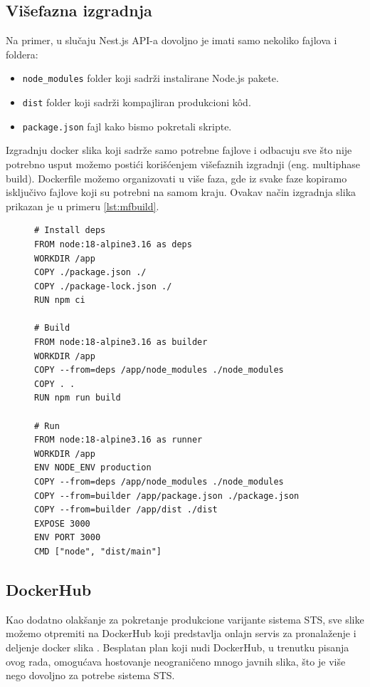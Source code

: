 \documentclass[12pt,oneside]{memoir}
\begin{document}
\subsection{Višefazna izgradnja}
Na primer, u slučaju Nest.js API-a dovoljno je imati samo nekoliko fajlova i foldera: 
\begin{itemize}
    \item \verb|node_modules| folder koji sadrži instalirane Node.js pakete.
    \item \verb|dist| folder koji sadrži kompajliran produkcioni k\^{o}d.
    \item \verb|package.json| fajl kako bismo pokretali skripte.
\end{itemize}

Izgradnju docker slika koji sadrže samo potrebne fajlove i odbacuju sve što nije potrebno usput možemo postići korišćenjem višefaznih izgradnji (eng. multiphase build). Dockerfile možemo organizovati u više faza, gde iz svake faze kopiramo isključivo fajlove koji su potrebni na samom kraju. Ovakav način izgradnja slika prikazan je u primeru \ref{lst:mfbuild}.

\begin{figure}[h]
\begin{lstlisting}[language=docker, caption={Višefazna izgradnja slike za API servis.}, label={lst:mfbuild}]
# Install deps
FROM node:18-alpine3.16 as deps
WORKDIR /app
COPY ./package.json ./
COPY ./package-lock.json ./
RUN npm ci

# Build
FROM node:18-alpine3.16 as builder
WORKDIR /app
COPY --from=deps /app/node_modules ./node_modules
COPY . .
RUN npm run build

# Run
FROM node:18-alpine3.16 as runner
WORKDIR /app
ENV NODE_ENV production
COPY --from=deps /app/node_modules ./node_modules
COPY --from=builder /app/package.json ./package.json
COPY --from=builder /app/dist ./dist
EXPOSE 3000
ENV PORT 3000
CMD ["node", "dist/main"]
\end{lstlisting}
\end{figure}

\newpage
\subsection{DockerHub}

Kao dodatno olakšanje za pokretanje produkcione varijante sistema STS, sve slike možemo otpremiti na DockerHub koji predstavlja onlajn servis za pronalaženje i deljenje docker slika \cite{dockerhubdocs}. Besplatan plan koji nudi DockerHub, u trenutku pisanja ovog rada, omogućava hostovanje neograničeno mnogo javnih slika, što je više nego dovoljno za potrebe sistema STS. 
\end{document}
